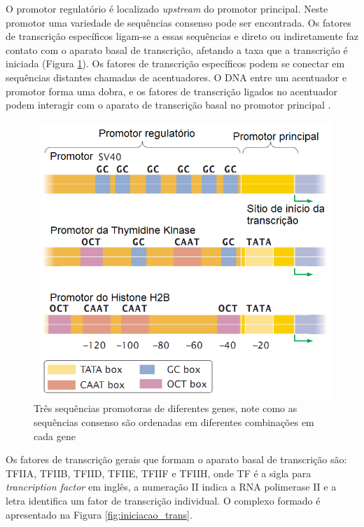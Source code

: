 O promotor regulatório é localizado \textit{upstream} do promotor principal. Neste promotor uma variedade de sequências consenso pode ser encontrada. Os fatores de transcrição específicos ligam-se a essas sequências e direto ou indiretamente faz contato com o aparato basal de transcrição, afetando a taxa que a transcrição é iniciada (Figura \ref{fig:promotor_regulacao}). Os fatores de transcrição específicos podem se conectar em sequências distantes chamadas de acentuadores. O DNA entre um acentuador e  promotor forma uma dobra, e os fatores de transcrição ligados no acentuador podem interagir com o aparato de transcrição basal no promotor principal \cite{Simmons2003}.

\begin{figure}[H]
    \centering
    \includegraphics[scale=0.7]{./figuras/promotor_regulacao.png}
    \caption{ Três sequências promotoras de diferentes genes, note como as sequências consenso são ordenadas em diferentes combinações em cada gene\cite[Adaptada]{Pierce2012}}
    \label{fig:promotor_regulacao}
\end{figure}

Os fatores de transcrição gerais que formam o aparato basal de transcrição são: TFIIA, TFIIB, TFIID, TFIIE, TFIIF e TFIIH, onde TF é a sigla para \textit{trancription factor} em inglês, a numeração II indica a RNA polimerase II e a letra identifica um fator de transcrição individual. O complexo formado é apresentado na Figura \ref{fig:iniciacao_trans}. 


